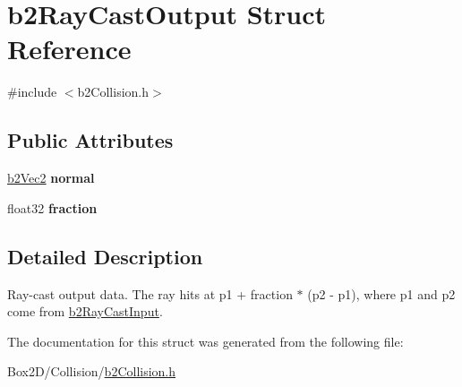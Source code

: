 \hypertarget{structb2_ray_cast_output}{}\section{b2\+Ray\+Cast\+Output Struct Reference}
\label{structb2_ray_cast_output}


{\ttfamily \#include $<$b2\+Collision.\+h$>$}

\subsection*{Public Attributes}
\begin{DoxyCompactItemize}
\item 
\mbox{\label{structb2_ray_cast_output_aa9bbfe75afa23c21e85cb1bd3736529b}} 
\hyperlink{structb2_vec2}{b2\+Vec2} {\bfseries normal}
\item 
\mbox{\label{structb2_ray_cast_output_a191c69bb399304bfe30c69e2158b3f29}} 
float32 {\bfseries fraction}
\end{DoxyCompactItemize}


\subsection{Detailed Description}
Ray-\/cast output data. The ray hits at p1 + fraction $\ast$ (p2 -\/ p1), where p1 and p2 come from \hyperlink{structb2_ray_cast_input}{b2\+Ray\+Cast\+Input}. 

The documentation for this struct was generated from the following file\+:\begin{DoxyCompactItemize}
\item 
Box2\+D/\+Collision/\hyperlink{b2_collision_8h}{b2\+Collision.\+h}\end{DoxyCompactItemize}
